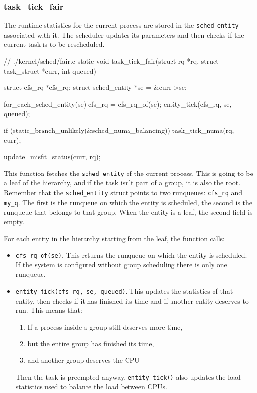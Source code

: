 \subsubsection{task\_tick\_fair}

The runtime statistics for the current process are stored in the \verb|sched_entity| associated with it. The scheduler updates its parameters and then checks if the current task is to be rescheduled. 

\begin{code}
// ./kernel/sched/fair.c
static void task_tick_fair(struct rq *rq, struct task_struct *curr, int queued)
{
	struct cfs_rq *cfs_rq;
	struct sched_entity *se = &curr->se;

	for_each_sched_entity(se) {
		cfs_rq = cfs_rq_of(se);
		entity_tick(cfs_rq, se, queued);
	}

	if (static_branch_unlikely(&sched_numa_balancing))
		task_tick_numa(rq, curr);

	update_misfit_status(curr, rq);
}
\end{code}
This function fetches the \verb|sched_entity| of the current process. This is going to be a leaf of the hierarchy, and if the task isn't part of a group, it is also the root. Remember that the \verb|sched_entity| struct points to two runqueues: \verb|cfs_rq| and \verb|my_q|. The first is the runqueue on which the entity is scheduled, the second is the runqueue that belongs to that group. When the entity is a leaf, the second field is empty. 

For each entity in the hierarchy starting from the leaf, the function calls:
\begin{itemize}
    \item \verb|cfs_rq_of(se)|. This returns the runqueue on which the entity is scheduled. If the system is configured without group scheduling there is only one runqueue.
    
    \item \verb|entity_tick(cfs_rq, se, queued)|. This updates the statistics of that entity, then checks if it has finished its time and if another entity deserves to run. This means that:
    \begin{enumerate}
        \item If a process inside a group still deserves more time,
        \item but the entire group has finished its time,
        \item and another group deserves the CPU
    \end{enumerate}
    Then the task is preempted anyway. \verb|entity_tick()| also updates the load statistics used to balance the load between CPUs.
\end{itemize}


